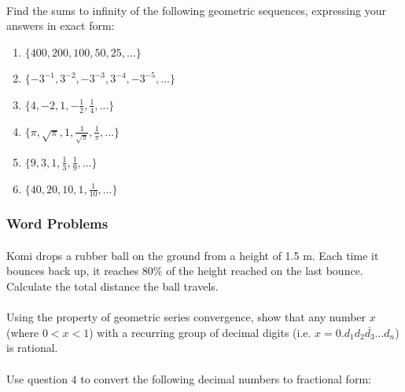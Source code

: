 \documentclass[12pt, a4paper, titlepage, twoside]{article}
\begin{document}
	\paragraph{}
	 Find the sums to infinity of the following geometric sequences, expressing your answers in exact
	form:
	
	\begin{multicols}{2}
		\begin{enumerate}[label=\textbf{(\alph*)}]
			\item $\{400, 200, 100, 50, 25,...\}$
			\item $\{-3^{-1}, 3^{-2}, -3^{-3}, 3^{-4}, -3^{-5}, ...\}$
			\item $\{4, -2, 1, -\frac{1}{2}, \frac{1}{4},...\}$
			\item $\{\pi, \sqrt{\pi}, 1, \frac{1}{\sqrt{\pi}}, \frac{1}{\pi}, ...\}$
			\item $\{9, 3, 1, \frac{1}{3}, \frac{1}{9},...\}$
			\item $\{40, 20, 10, 1, \frac{1}{10},...\}$
		\end{enumerate}
	\end{multicols}
	
	\subsubsection*{Word Problems}	
	
	\paragraph{}
	 Komi drops a rubber ball on the ground from a height of 1.5 m. Each time it bounces back up, it reaches
	$80\%$ of the height reached on the last bounce. Calculate the total distance the ball travels.
	
	\paragraph{}
	 Using the property of geometric series convergence, show that any number $x$ (where $0 < x < 1$) 
	with a recurring group of decimal digits (i.e. $x = 0.\overline{d_1 d_2 d_3 ... d_n}$) is rational.
	
	\paragraph{}
	 Use question $4$ to convert the following decimal numbers to fractional form:
	
\end{document}
